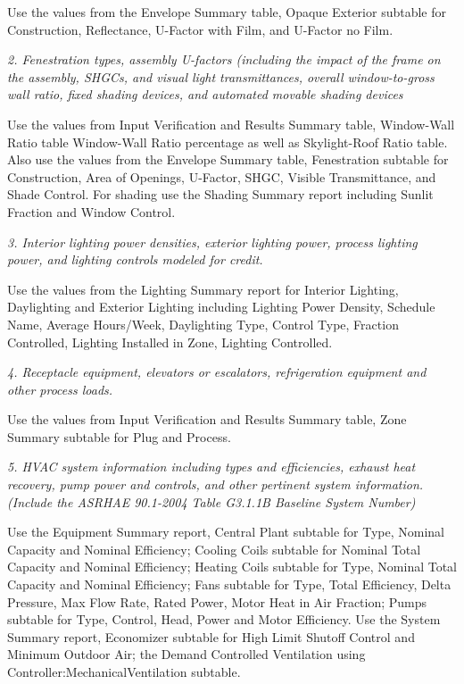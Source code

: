 Use the values from the Envelope Summary table, Opaque Exterior subtable for Construction, Reflectance, U-Factor with Film, and U-Factor no Film.

\emph{2. Fenestration types, assembly U-factors (including the impact of the frame on the assembly, SHGCs, and visual light transmittances, overall window-to-gross wall ratio, fixed shading devices, and automated movable shading devices}

Use the values from Input Verification and Results Summary table, Window-Wall Ratio table Window-Wall Ratio percentage as well as Skylight-Roof Ratio table. Also use the values from the Envelope Summary table, Fenestration subtable for Construction, Area of Openings, U-Factor, SHGC, Visible Transmittance, and Shade Control. For shading use the Shading Summary report including Sunlit Fraction and Window Control.

\emph{3. Interior lighting power densities, exterior lighting power, process lighting power, and lighting controls modeled for credit.}

Use the values from the Lighting Summary report for Interior Lighting, Daylighting and Exterior Lighting including Lighting Power Density, Schedule Name, Average Hours/Week, Daylighting Type, Control Type, Fraction Controlled, Lighting Installed in Zone, Lighting Controlled.

\emph{4. Receptacle equipment, elevators or escalators, refrigeration equipment and other process loads.}

Use the values from Input Verification and Results Summary table, Zone Summary subtable for Plug and Process.

\emph{5. HVAC system information including types and efficiencies, exhaust heat recovery, pump power and controls, and other pertinent system information. (Include the ASRHAE 90.1-2004 Table G3.1.1B Baseline System Number)}

Use the Equipment Summary report, Central Plant subtable for Type, Nominal Capacity and Nominal Efficiency; Cooling Coils subtable for Nominal Total Capacity and Nominal Efficiency; Heating Coils subtable for Type, Nominal Total Capacity and Nominal Efficiency; Fans subtable for Type, Total Efficiency, Delta Pressure, Max Flow Rate, Rated Power, Motor Heat in Air Fraction; Pumps subtable for Type, Control, Head, Power and Motor Efficiency. Use the System Summary report, Economizer subtable for High Limit Shutoff Control and Minimum Outdoor Air; the Demand Controlled Ventilation using Controller:MechanicalVentilation subtable.

